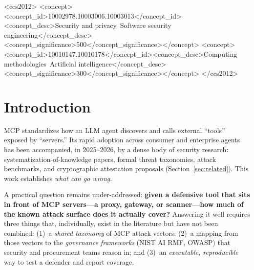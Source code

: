 \documentclass[sigconf,review]{acmart}
\begin{document}
\begin{CCSXML}
<ccs2012>
<concept><concept_id>10002978.10003006.10003013</concept_id><concept_desc>Security and privacy~Software security engineering</concept_desc><concept_significance>500</concept_significance></concept>
<concept><concept_id>10010147.10010178</concept_id><concept_desc>Computing methodologies~Artificial intelligence</concept_desc><concept_significance>300</concept_significance></concept>
</ccs2012>
\end{CCSXML}


\maketitle

\section{Introduction}
MCP standardizes how an LLM agent discovers and calls external ``tools'' exposed by ``servers.'' Its rapid adoption across consumer and enterprise agents has been accompanied, in 2025--2026, by a dense body of security research: systematization-of-knowledge papers, formal threat taxonomies, attack benchmarks, and cryptographic attestation proposals (Section~\ref{sec:related}). This work establishes \emph{what can go wrong}.

A practical question remains under-addressed: \textbf{given a defensive tool that sits in front of MCP servers---a proxy, gateway, or scanner---how much of the known attack surface does it actually cover?} Answering it well requires three things that, individually, exist in the literature but have not been combined: (1)~a \emph{shared taxonomy} of MCP attack vectors; (2)~a mapping from those vectors to the \emph{governance frameworks} (NIST AI RMF, OWASP) that security and procurement teams reason in; and (3)~an \emph{executable, reproducible} way to test a defender and report coverage.
\end{document}
